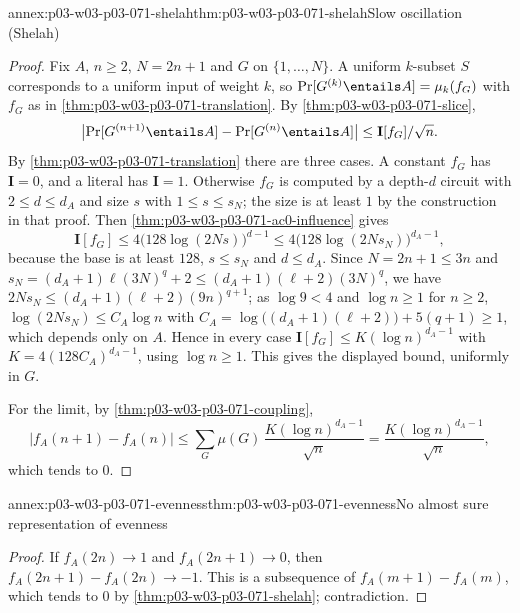 \begin{annexitem}{annex:p03-w03-p03-071-shelah}{thm:p03-w03-p03-071-shelah}{Slow oscillation (Shelah)}
\begin{proof}
Fix \(A\), \(n\geq2\), \(N=2n+1\) and \(G\) on \(\{1,\ldots,N\}\).  A
uniform \(k\)-subset \(S\) corresponds to a uniform input of weight \(k\),
so \(\Pr[G^{(k)}\entails A]=\mu_k(f_G)\) with \(f_G\) as in
\cref{thm:p03-w03-p03-071-translation}.  By
\cref{thm:p03-w03-p03-071-slice},
\[
  \bigl|\Pr[G^{(n+1)}\entails A]-\Pr[G^{(n)}\entails A]\bigr|\leq
  \mathbf I[f_G]/\sqrt n .
\]
By \cref{thm:p03-w03-p03-071-translation} there are three cases.  A
constant \(f_G\) has \(\mathbf I=0\), and a literal has \(\mathbf I=1\).
Otherwise \(f_G\) is computed by a depth-\(d\) circuit with
\(2\leq d\leq d_A\) and size \(s\) with \(1\leq s\leq s_N\); the size is at
least \(1\) by the construction in that proof.  Then
\cref{thm:p03-w03-p03-071-ac0-influence} gives
\[
  \mathbf I[f_G]\leq4\bigl(128\log(2Ns)\bigr)^{d-1}
  \leq4\bigl(128\log(2Ns_N)\bigr)^{d_A-1},
\]
because the base is at least \(128\), \(s\leq s_N\) and \(d\leq d_A\).
Since \(N=2n+1\leq3n\) and \(s_N=(d_A+1)\ell(3N)^q+2\leq
(d_A+1)(\ell+2)(3N)^q\), we have \(2Ns_N\leq(d_A+1)(\ell+2)(9n)^{q+1}\); as
\(\log9<4\) and \(\log n\geq1\) for \(n\geq2\),
\(\log(2Ns_N)\leq C_A\log n\) with
\(C_A=\log\bigl((d_A+1)(\ell+2)\bigr)+5(q+1)\geq1\), which depends only on
\(A\).  Hence in every case
\(\mathbf I[f_G]\leq K(\log n)^{d_A-1}\) with \(K=4(128C_A)^{d_A-1}\), using
\(\log n\geq1\).  This gives the displayed bound, uniformly in \(G\).

For the limit, by \cref{thm:p03-w03-p03-071-coupling},
\[
 |f_A(n+1)-f_A(n)|\leq\sum_G\mu(G)\,\frac{K(\log n)^{d_A-1}}{\sqrt n}
 =\frac{K(\log n)^{d_A-1}}{\sqrt n},
\]
which tends to \(0\).
\end{proof}
\end{annexitem}

\begin{annexitem}{annex:p03-w03-p03-071-evenness}{thm:p03-w03-p03-071-evenness}{No almost sure representation of evenness}
\begin{proof}
If \(f_A(2n)\to1\) and \(f_A(2n+1)\to0\), then
\(f_A(2n+1)-f_A(2n)\to-1\).  This is a subsequence of
\(f_A(m+1)-f_A(m)\), which tends to \(0\) by
\cref{thm:p03-w03-p03-071-shelah}; contradiction.
\end{proof}
\end{annexitem}

